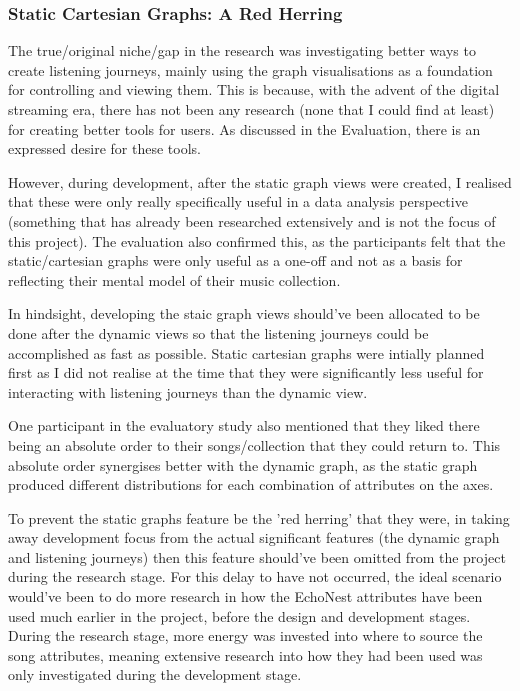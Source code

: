 \subsubsection{Static Cartesian Graphs: A Red Herring}
The true/original niche/gap in the research was investigating better ways to create listening journeys, mainly using the graph visualisations as a foundation for controlling and viewing them. This is because, with the advent of the digital streaming era, there has not been any research (none that I could find at least) for creating better tools for users. As discussed in the Evaluation, there is an expressed desire for these tools.

However, during development, after the static graph views were created, I realised that these were only really specifically useful in a data analysis perspective (something that has already been researched extensively and is not the focus of this project). The evaluation also confirmed this, as the participants felt that the static/cartesian graphs were only useful as a one-off and not as a basis for reflecting their mental model of their music collection.

In hindsight, developing the staic graph views should've been allocated to be done after the dynamic views so that the listening journeys could be accomplished as fast as possible. Static cartesian graphs were intially planned first as I did not realise at the time that they were significantly less useful for interacting with listening journeys than the dynamic view.

One participant in the evaluatory study also mentioned that they liked there being an absolute order to their songs/collection that they could return to. This absolute order synergises better with the dynamic graph, as the static graph produced different distributions for each combination of attributes on the axes.

To prevent the static graphs feature be the 'red herring' that they were, in taking away development focus from the actual significant features (the dynamic graph and listening journeys) then this feature should've been omitted from the project during the research stage.
For this delay to have not occurred, the ideal scenario would've been to do more research in how the EchoNest attributes have been used much earlier in the project, before the design and development stages. 
During the research stage, more energy was invested into where to source the song attributes, meaning extensive research into how they had been used was only investigated during the development stage.

